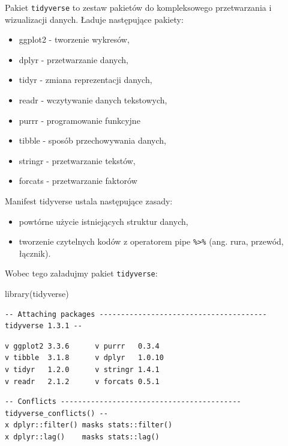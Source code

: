 \documentclass[
  letterpaper,
  DIV=11,
  numbers=noendperiod]{scrreprt}
\newenvironment{Shaded}{\begin{snugshade}}{\end{snugshade}}
\newcommand{\FunctionTok}[1]{\textcolor[rgb]{0.28,0.35,0.67}{#1}}
\newcommand{\NormalTok}[1]{\textcolor[rgb]{0.00,0.23,0.31}{#1}}
\providecommand{\tightlist}{%
  \setlength{\itemsep}{0pt}\setlength{\parskip}{0pt}}\usepackage{longtable,booktabs,array}
\begin{document}
Pakiet \texttt{tidyverse} to zestaw pakietów do kompleksowego
przetwarzania i wizualizacji danych. Ładuje następujące pakiety:

\begin{itemize}
\tightlist
\item
  ggplot2 - tworzenie wykresów,
\item
  dplyr - przetwarzanie danych,
\item
  tidyr - zmiana reprezentacji danych,
\item
  readr - wczytywanie danych tekstowych,
\item
  purrr - programowanie funkcyjne
\item
  tibble - sposób przechowywania danych,
\item
  stringr - przetwarzanie tekstów,
\item
  forcats - przetwarzanie faktorów
\end{itemize}

Manifest tidyverse ustala następujące zasady:

\begin{itemize}
\tightlist
\item
  powtórne użycie istniejących struktur danych,
\item
  tworzenie czytelnych kodów z operatorem pipe
  \texttt{\%\textgreater{}\%} (ang. rura, przewód, łącznik).
\end{itemize}

Wobec tego załadujmy pakiet \texttt{tidyverse}:

\begin{Shaded}
\begin{Highlighting}[]
\FunctionTok{library}\NormalTok{(tidyverse)}
\end{Highlighting}
\end{Shaded}

\begin{verbatim}
-- Attaching packages --------------------------------------- tidyverse 1.3.1 --
\end{verbatim}

\begin{verbatim}
v ggplot2 3.3.6      v purrr   0.3.4 
v tibble  3.1.8      v dplyr   1.0.10
v tidyr   1.2.0      v stringr 1.4.1 
v readr   2.1.2      v forcats 0.5.1 
\end{verbatim}

\begin{verbatim}
-- Conflicts ------------------------------------------ tidyverse_conflicts() --
x dplyr::filter() masks stats::filter()
x dplyr::lag()    masks stats::lag()
\end{verbatim}
\end{document}
